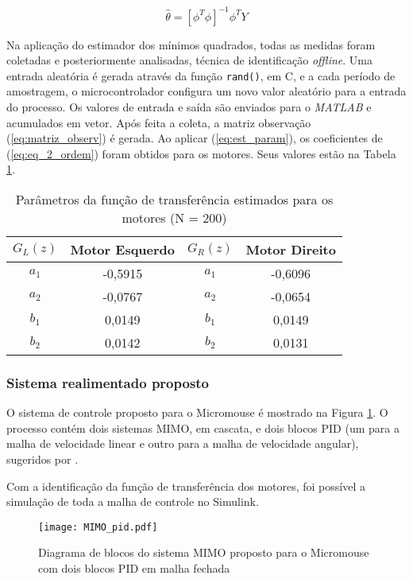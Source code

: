 	\begin{equation}
\label{eq:est_param}
\hat{\theta} = [\phi^T\phi]^{-1}\phi^TY
\end{equation}

Na aplicação do estimador dos mínimos quadrados, todas as medidas foram coletadas e posteriormente analisadas, técnica de identificação \emph{offline}.
Uma entrada aleatória é gerada através da função \texttt{rand()}, em C, e a cada período de amostragem, o microcontrolador configura um novo valor aleatório para a entrada do processo. Os valores de entrada e saída são enviados para o \textit{MATLAB} e acumulados em vetor. Após feita a coleta, a matriz observação (\ref{eq:matriz_observ}) é gerada. Ao aplicar (\ref{eq:est_param}), os coeficientes de (\ref{eq:eq_2_ordem}) foram obtidos para os motores. Seus valores estão na Tabela \ref{tab:parametros_teta}.

\begin{table}[!htb]
	\centering
	\caption{\label{tab:parametros_teta}Parâmetros da função de transferência estimados para os motores (N = 200)}
	\begin{tabular}{cc|cc}
	$G_L(z)$ & Motor Esquerdo & $G_R(z)$ & Motor Direito \\ 
	\hline 
	$a_1$ & -0,5915 & $a_1$ & -0,6096 \\ 
	\hline 
	$a_2$ & -0,0767 & $a_2$ & -0,0654 \\ 
	\hline 
	$b_1$ & 0,0149 & $b_1$ & 0,0149 \\ 
	\hline 
	$b_2$ & 0,0142 & $b_2$ & 0,0131 \\ 
	\end{tabular} 
	
\end{table}

	\subsubsection{Sistema realimentado proposto}
	O sistema de controle proposto para o Micromouse é mostrado na Figura \ref{fig:mimo_pid}. O processo contém dois sistemas MIMO, em cascata, e dois blocos PID (um para a malha de velocidade linear e outro para a malha de velocidade angular), sugeridos por .

	Com a identificação da função de transferência dos motores, foi possível a simulação de toda a malha de controle no Simulink. 
	
\begin{figure}[!htb]
	\caption{\label{fig:mimo_pid}Diagrama de blocos do sistema MIMO proposto para o Micromouse com dois blocos PID em malha fechada}
	\begin{center}
		\texttt{[image: MIMO\_pid.pdf]}
	\end{center}
\end{figure} 



